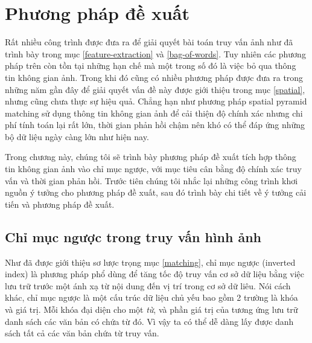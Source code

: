 \chapter{Phương pháp đề xuất}
\label{chapter:proposed}
\ifpdf
    \graphicspath{{Chapter3/Chapter3Figs/PNG/}{Chapter3/Chapter3Figs/PDF/}{Chapter3/Chapter3Figs/}}
\else
    \graphicspath{{Chapter3/Chapter3Figs/EPS/}{Chapter3/Chapter3Figs/}}
\fi


Rất nhiều công trình được đưa ra để giải quyết bài toán truy vấn ảnh như đã trình bày trong mục \ref{feature-extraction} và \ref{bag-of-words}. Tuy nhiên các phương pháp trên còn tồn tại những hạn chế mà một trong số đó là việc bỏ qua thông tin không gian ảnh. Trong khi đó cũng có nhiều phương pháp được đưa ra trong những năm gần đây để giải quyết vấn đề này được giới thiệu trong mục \ref{spatial}, nhưng cũng chưa thực sự hiệu quả. Chẳng hạn như phương pháp spatial pyramid matching\cite{lazebnik2006beyond} sử dụng thông tin không gian ảnh để cải thiện độ chính xác nhưng chi phí tính toán lại rất lớn, thời gian phản hồi chậm nên khó có thể đáp ứng những bộ dữ liệu ngày càng lớn như hiện nay.

Trong chương này, chúng tôi sẽ trình bày phương pháp đề xuất tích hợp thông tin không gian ảnh vào chỉ mục ngược, với mục tiêu cân bằng độ chính xác truy vấn và thời gian phản hồi. Trước tiên chúng tôi nhắc lại những công trình khơi nguồn ý tưởng cho phương pháp đề xuất, sau đó trình bày chi tiết về ý tưởng cải tiến và phương pháp đề xuất.

\section{Chỉ mục ngược trong truy vấn hình ảnh}
\label{sec:inverted-index}
Như đã được giới thiệu sơ lược trọng mục \ref{matching}, chỉ mục ngược (inverted index) là phương pháp phổ dùng để tăng tốc độ truy vấn cơ sở dữ liệu bằng việc lưu trữ trước một ánh xạ từ nội dung đến vị trí trong cơ sở dữ liêu. Nói cách khác, chỉ mục ngược là một cấu trúc dữ liệu chủ yếu bao gồm 2 trường là khóa và giá trị. Mỗi khóa đại diện cho một \textit{từ}, và phần giá trị của tương ứng lưu trữ danh sách các văn bản có chứa từ đó. Vì vậy ta có thể dễ dàng lấy được danh sách tất cả các văn bản chứa từ truy vấn.

